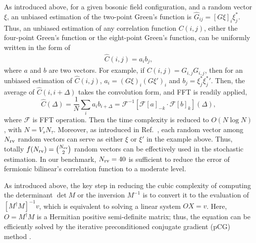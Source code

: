 \documentclass[aps,prl,twocolumn,superscriptaddress,showpacs,longbibliography]{revtex4-2}
\newcommand{\tx}[1]{\textmd{#1}}
\newcommand{\onefrac}[1]{\frac{1}{#1}}
\begin{document}
As introduced above, for a given bosonic field configuration, and a random vector $\xi$, an unbiased estimation of the two-point Green's function is $\hat{G}_{ij} = \left[ G\xi\right]_i \xi^*_j$. Thus, an unbiased estimation of any correlation function $C(i,j)$, either the four-point Green's function or the eight-point Green's function, can be uniformly written in the form of
\begin{align}
    \hat{C}(i, j) = a_{i}b_{j}, \label{eq:Cij_est}
\end{align}
where $a$ and $b$ are two vectors. For example, if $C(i, j) = G_{ i , j } G_{ i  , j}$, then for an unbiased estimation of $\hat{C}(i, j)$, $a_i= (G\xi)_i (G\xi')_i$ and $b_j = {\xi^*_j} {\xi^*_j}'$. Then, the average of $\hat{C}(i, i+\Delta)$ takes the convolution form, and FFT is readily applied,
\begin{equation}
\hat{C}(\Delta) = \onefrac{N}\sum_i a_i b_{i+\Delta} = \mathcal{F}^{-1}[\mathcal{F}[a]_{-k} \cdot \mathcal{F}[b]_k](\Delta),
\end{equation}
where $\mathcal{F}$ is FFT operation. Then the time complexity is reduced to $O(N\log N)$, with $N=V_s N_\tau$.
Moreover, as introduced in Ref.~\cite{cohen2022fast}, each random vector among $N_\tx{rv}$ random vectors can serve as either $\xi$ or $\xi'$ in the example above. Thus, totally $f(N_\tx{rv}) = \binom{N_\tx{rv}}{2}$ random vectors can be effectively used in the stochastic estimation. In our benchmark, $N_\tx{rv}= 40$ is sufficient to reduce the error of  fermionic bilinear's correlation function to a moderate level. \\

\vspace{3mm} 
\label{sec:pcg}

As introduced above, the key step in reducing the cubic complexity of computing the determinant $
\det M$ or the inversion $M^{-1}$ is to convert it to the evaluation of $\left[M^\dagger M\right]^{-1}v$, which is equivalent to solving a linear system $O X = v$. Here, $O = M^{\dagger}M$ is a Hermitian positive semi-definite matrix; thus, the equation can be efficiently solved by the iterative preconditioned conjugate gradient (pCG) method \cite{Beyl2018}.
\end{document}
